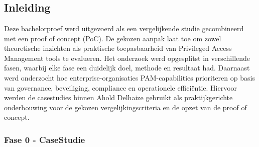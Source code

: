 
\chapter{}%
\label{ch:methodologie}

\section{Inleiding}
Deze bachelorproef werd uitgevoerd als een vergelijkende studie gecombineerd met een proof of concept (PoC). De gekozen aanpak laat toe om zowel theoretische inzichten als praktische toepasbaarheid van Privileged Access Management tools te evalueren. Het onderzoek werd opgesplitst in verschillende fasen, waarbij elke fase een duidelijk doel, methode en resultaat had. Daarnaast werd onderzocht hoe enterprise-organisaties PAM-capabilities prioriteren op basis van governance, beveiliging, compliance en operationele efficiëntie. Hiervoor werden de casestudies binnen Ahold Delhaize gebruikt als praktijkgerichte onderbouwing voor de gekozen vergelijkingscriteria en de opzet van de proof of concept.

\subsection{Fase 0 - CaseStudie}
